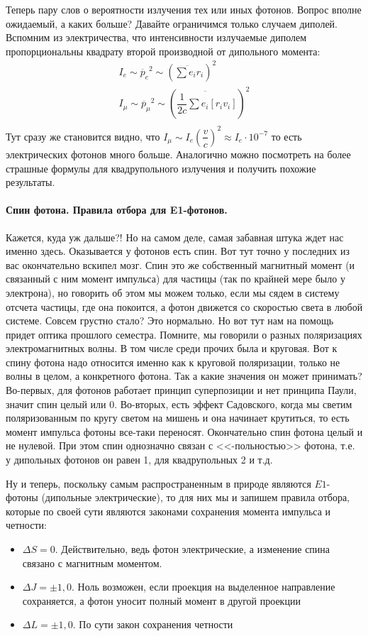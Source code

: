 \documentclass[12pt]{article}
\begin{document}
Теперь пару слов о вероятности излучения тех или иных фотонов. Вопрос вполне ожидаемый, а каких больше? Давайте ограничимся только случаем диполей. Вспомним из электричества, что интенсивности излучаемые диполем пропорциональны квадрату второй производной от дипольного момента:
\begin{gather*}
    I_e \sim \ddot{p_e}^2 \sim \left(\ddot{\sum{e_i r_i}} \right)^2\\
    I_{\mu} \sim \ddot{p_{\mu}}^2\sim \left(\ddot{\dfrac{1}{2c}\sum{e_i [r_i v_i]}} \right)^2\\
\end{gather*}
Тут сразу же становится видно, что $ I_{\mu} \sim  I_{e} \left(\dfrac{v}{c} \right)^2\approx I_e \cdot 10^{-7}$ то есть электрических фотонов много больше. Аналогично можно посмотреть на более страшные формулы для квадрупольного излучения и получить похожие результаты.

\paragraph{Спин фотона. Правила отбора для E1-фотонов.} Кажется, куда уж дальше?! Но на самом деле, самая забавная штука ждет нас именно здесь. Оказывается у фотонов есть спин. Вот тут точно у последних из вас окончательно вскипел мозг. Спин это же собственный магнитный момент (и связанный с ним момент импульса) для частицы (так по крайней мере было у электрона), но говорить об этом мы можем только, если мы сядем в систему отсчета частицы, где она покоится, а фотон движется со скоростью света в любой системе.  Совсем грустно стало? Это нормально. Но вот тут нам на помощь придет оптика прошлого семестра. Помните, мы говорили о разных поляризациях электромагнитных волны. В том числе среди прочих была и круговая. Вот к спину фотона надо относится именно как к круговой поляризации, только не волны в целом, а конкретного фотона. Так а какие значения он может принимать? Во-первых, для фотонов работает принцип суперпозиции и нет принципа Паули, значит спин целый или 0. Во-вторых, есть эффект Садовского, когда мы светим поляризованным по кругу светом на мишень и она начинает крутиться, то есть момент импульса фотоны все-таки переносят. Окончательно спин фотона целый и не нулевой. При этом спин однозначно связан с <<-польностью>> фотона, т.е. у дипольных фотонов он равен 1, для квадрупольных 2 и т.д.

Ну и теперь, поскольку самым распространенным в природе являются $E1$- фотоны (дипольные электрические), то для них мы и запишем правила отбора, которые по своей сути являются законами сохранения момента импульса и четности:
\begin{itemize}
    \item $\Delta S =0$. Действительно, ведь фотон электрические, а изменение спина связано с магнитным моментом.
    \item $\Delta J = \pm 1, 0$. Ноль возможен, если проекция на выделенное направление сохраняется, а фотон уносит полный момент в другой проекции
    \item $\Delta L = \pm 1, 0$. По сути закон сохранения четности
\end{itemize}
\end{document}

